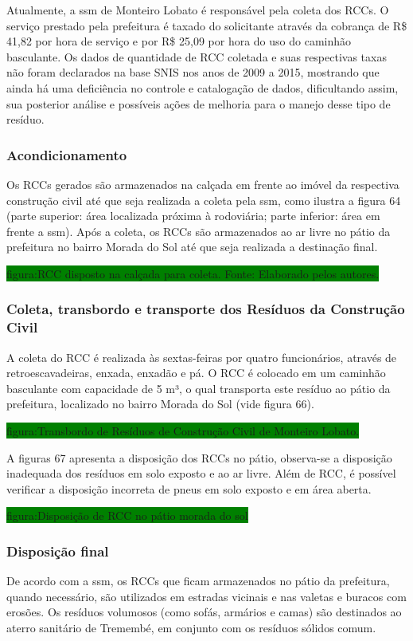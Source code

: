 	Atualmente, a \gls{ssm} de Monteiro Lobato é responsável pela coleta dos RCCs. O serviço prestado pela prefeitura é taxado do solicitante através da cobrança de R\$ 41,82 por hora de serviço e por R\$ 25,09 por hora do uso do caminhão basculante. Os dados de quantidade de RCC coletada e suas respectivas taxas não foram declarados na base SNIS nos anos de 2009 a 2015, mostrando que ainda há uma deficiência no controle e catalogação de dados, dificultando assim, sua posterior análise e possíveis ações de melhoria para o manejo desse tipo de resíduo.
	
	\subsubsection{Acondicionamento}
	Os RCCs gerados são armazenados na calçada em frente ao imóvel da respectiva construção civil até que seja realizada a coleta pela \gls{ssm}, como ilustra a figura 64 (parte superior: área localizada próxima à rodoviária; parte inferior: área em frente a \gls{ssm}). Após a coleta, os RCCs são armazenados ao ar livre no pátio da prefeitura no bairro Morada do Sol até que seja realizada a destinação final.
	
	\colorbox{green}{figura:RCC disposto na calçada para coleta. Fonte: Elaborado pelos autores.}
	
	\subsubsection{Coleta, transbordo e transporte dos Resíduos da Construção Civil}
	A coleta do RCC é realizada às sextas-feiras por quatro funcionários, através de retroescavadeiras, enxada, enxadão e pá. O RCC é colocado em um caminhão basculante com capacidade de 5 m³, o qual transporta este resíduo ao pátio da prefeitura, localizado no bairro Morada do Sol (vide figura 66).
	
	\colorbox{green}{figura:Transbordo de Resíduos de Construção Civil de Monteiro Lobato.}
	
	A figuras 67 apresenta a disposição dos RCCs no pátio, observa-se a disposição inadequada dos resíduos em solo exposto e ao ar livre. Além de RCC, é possível verificar a disposição incorreta de pneus em solo exposto e em área aberta.
	
	\colorbox{green}{figura:Disposição de RCC no pátio morada do sol}
	
	\subsubsection{Disposição final}
	De acordo com a \gls{ssm}, os RCCs que ficam armazenados no pátio da prefeitura, quando necessário, são utilizados em estradas vicinais e nas valetas e buracos com erosões. Os resíduos volumosos (como sofás, armários e camas) são destinados ao aterro sanitário de Tremembé, em conjunto com os resíduos sólidos comum.
	
